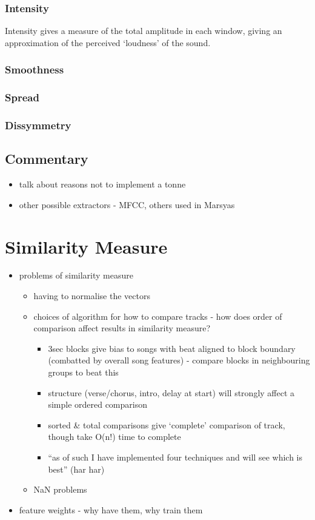 \subsubsection{Intensity}

Intensity gives a measure of the total amplitude in each window, giving an approximation of the perceived `loudness' of the sound. 
\subsubsection{Smoothness}

\subsubsection{Spread}

\subsubsection{Dissymmetry}

\subsection{Commentary}

\begin{itemize}
	\item talk about reasons not to implement a tonne
	\item other possible extractors - MFCC, others used in Marsyas
\end{itemize}
\section{Similarity Measure}
\begin{itemize}
	\item problems of similarity measure
	\begin{itemize}
		\item having to normalise the vectors
		\item choices of algorithm for how to compare tracks - how does order of comparison affect results in similarity measure?
		\begin{itemize}
			\item 3sec blocks give bias to songs with beat aligned to block boundary (combatted by overall song features) - compare blocks in neighbouring groups to beat this
			\item structure (verse/chorus, intro, delay at start) will strongly affect a simple ordered comparison
			\item sorted \& total comparisons give `complete' comparison of track, though take O(n!) time to complete
			\item ``as of such I have implemented four techniques and will see which is best'' (har har)
		\end{itemize}
		\item NaN problems
	\end{itemize}
	\item feature weights - why have them, why train them
\end{itemize}
